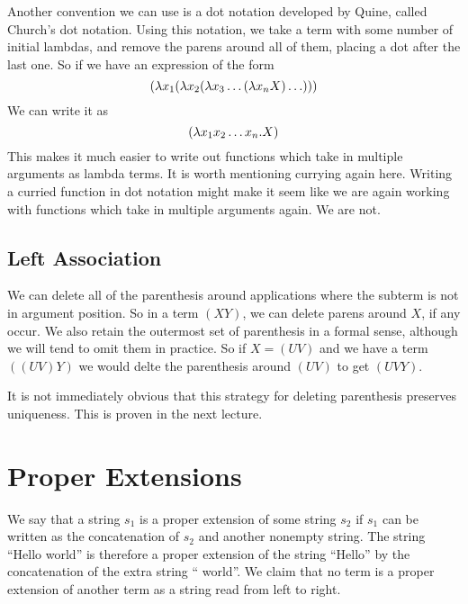 Another convention we can use is a dot notation developed by Quine, called Church's dot notation. Using this notation, we take a term with some number of initial lambdas, and remove the parens around all of them, placing a dot after the last one. So if we have an expression of the form
\begin{equation*}
  (\lambda x_1(\lambda x_2(\lambda x_3\ldots(\lambda x_nX)\ldots)))
\end{equation*}
We can write it as
\begin{equation*}
  (\lambda x_1x_2\ldots x_n.X)
\end{equation*}
This makes it much easier to write out functions which take in multiple arguments as lambda terms. It is worth mentioning currying again here. Writing a curried function in dot notation might make it seem like we are again working with functions which take in multiple arguments again. We are not.


\subsection{Left Association}
We can delete all of the parenthesis around applications where the subterm is not in argument position. So in a term $(XY)$, we can delete parens around $X$, if any occur. We also retain the outermost set of parenthesis in a formal sense, although we will tend to omit them in practice. So if $X = (UV)$ and we have a term $((UV)Y)$ we would delte the parenthesis around $(UV)$ to get $(UVY)$.


It is not immediately obvious that this strategy for deleting parenthesis preserves uniqueness. This is proven in the next lecture.

\section{Proper Extensions}
We say that a string $s_1$ is a proper extension of some string $s_2$ if $s_1$ can be written as the concatenation of $s_2$ and another nonempty string. The string ``Hello world'' is therefore a proper extension of the string ``Hello'' by the concatenation of the extra string `` world''. We claim that no term is a proper extension of another term as a string read from left to right.\\

